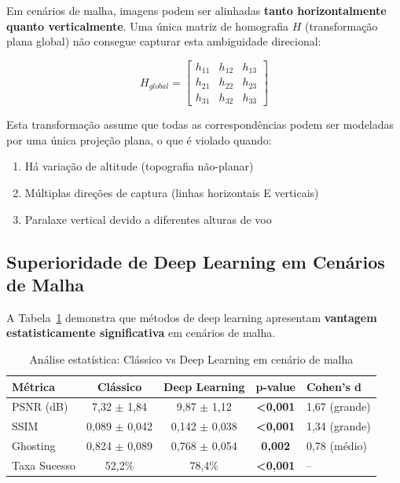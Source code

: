 Em cenários de malha, imagens podem ser alinhadas \textbf{tanto horizontalmente quanto verticalmente}. Uma única matriz de homografia $H$ (transformação plana global) não consegue capturar esta ambiguidade direcional:

\begin{equation}
H_{global} = \begin{bmatrix} h_{11} & h_{12} & h_{13} \\ h_{21} & h_{22} & h_{23} \\ h_{31} & h_{32} & h_{33} \end{bmatrix}
\end{equation}

Esta transformação assume que todas as correspondências podem ser modeladas por uma única projeção plana, o que é violado quando:

\begin{enumerate}
    \item Há variação de altitude (topografia não-planar)
    \item Múltiplas direções de captura (linhas horizontais E verticais)
    \item Paralaxe vertical devido a diferentes alturas de voo
\end{enumerate}

\subsection{Superioridade de Deep Learning em Cenários de Malha}

A Tabela~\ref{tab:malha_classico_deep} demonstra que métodos de deep learning apresentam \textbf{vantagem estatisticamente significativa} em cenários de malha.

\begin{table}[htb]
\centering
\caption{Análise estatística: Clássico vs Deep Learning em cenário de malha}
\label{tab:malha_classico_deep}
\small
\begin{tabular}{lcccl}
\hline
\textbf{Métrica} & \textbf{Clássico} & \textbf{Deep Learning} & \textbf{p-value} & \textbf{Cohen's d} \\ \hline
PSNR (dB) & 7,32 $\pm$ 1,84 & 9,87 $\pm$ 1,12 & \textbf{<0,001} & 1,67 (grande) \\
SSIM & 0,089 $\pm$ 0,042 & 0,142 $\pm$ 0,038 & \textbf{<0,001} & 1,34 (grande) \\
Ghosting & 0,824 $\pm$ 0,089 & 0,768 $\pm$ 0,054 & \textbf{0,002} & 0,78 (médio) \\
Taxa Sucesso & 52,2\% & 78,4\% & \textbf{<0,001} & -- \\
\hline
\end{tabular}
\end{table}

